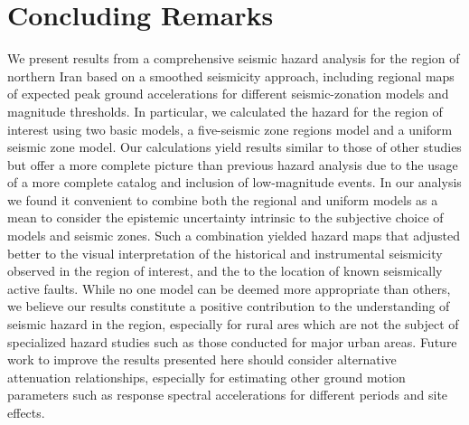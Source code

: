
\section{Concluding Remarks}

We present results from a comprehensive seismic hazard analysis for the region of northern Iran based on a smoothed seismicity approach, including regional maps of expected peak ground accelerations for different seismic-zonation models and magnitude thresholds. In particular, we calculated the hazard for the region of interest using two basic models, a five-seismic zone regions model and a uniform seismic zone model. Our calculations yield results similar to those of other studies but offer a more complete picture than previous hazard analysis due to the usage of a more complete catalog and inclusion of low-magnitude events. In our analysis we found it convenient to combine both the regional and uniform models as a mean to consider the epistemic uncertainty intrinsic to the subjective choice of models and seismic zones. Such a combination yielded hazard maps that adjusted better to the visual interpretation of the historical and instrumental seismicity observed in the region of interest, and the to the location of known seismically active faults. While no one model can be deemed more appropriate than others, we believe our results constitute a positive contribution to the understanding of seismic hazard in the region, especially for rural ares which are not the subject of specialized hazard studies such as those conducted for major urban areas. Future work to improve the results presented here should consider alternative attenuation relationships, especially for estimating other ground motion parameters such as response spectral accelerations for different periods and site effects.


